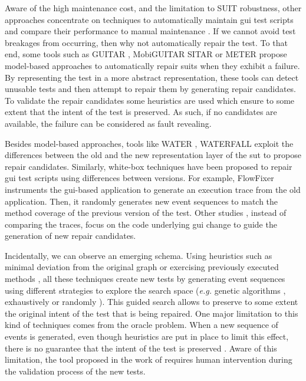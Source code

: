 Aware of the high maintenance cost, and the limitation to SUIT robustness, other approaches concentrate on techniques to automatically maintain \gls{gui} test scripts and compare their performance to manual maintenance \cite{Grechanik2009, Grechanik2009b}. If we cannot avoid test breakages from occurring, then why not automatically repair the test. To that end, some tools such as GUITAR \cite{Memon2008}, MobiGUITAR \cite{Amalfitano2015b} SITAR \cite{Gao2016} or METER \cite{Pan2020} propose model-based approaches to automatically repair \gls{suit}s when they exhibit a failure. By representing the test in a more abstract representation, these tools can detect unusable tests and then attempt to repair them by generating repair candidates. To validate the repair candidates some heuristics are used which ensure to some extent that the intent of the test is preserved. As such, if no candidates are available, the failure can be considered as fault revealing.

Besides model-based approaches, tools like WATER \cite{Choudhary2011}, WATERFALL \cite{Hammoudi2016b} exploit the differences between the old and the new representation layer of the \gls{sut} to propose repair candidates. Similarly, white-box techniques have been proposed to repair \gls{gui} test scripts using differences between versions. For example, FlowFixer \cite{Zhang2013} instruments the \gls{gui}-based application to generate an execution trace from the old application. Then, it randomly generates new event sequences to match the method coverage of the previous version of the test. Other studies \cite{Grechanik2009, Fu2009}, instead of comparing the traces, focus on the code underlying \gls{gui} change to guide the generation of new repair candidates.

Incidentally, we can observe an emerging schema. Using heuristics such as minimal deviation from the original graph\cite{Memon2008} or exercising previously executed methods \cite{Zhang2013}, all these techniques create new tests by generating event sequences using different strategies  to explore the search space (\emph{e.g.} genetic algorithms \cite{Huang2010}, exhaustively \cite{Memon2008} or randomly \cite{Zhang2013}). This guided search allows to preserve to some extent the original intent of the test that is being repaired. One major limitation to this kind of techniques comes from the oracle problem. When a new sequence of events is generated, even though heuristics are put in place to limit this effect, there is no guarantee that the intent of the test is preserved \cite{Li2019}. Aware of this limitation, the tool proposed in the work of \textcite{Gao2016} requires human intervention during the validation process of the new tests.


